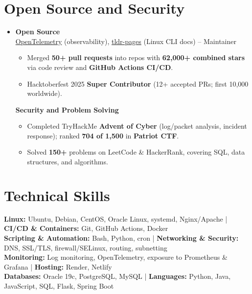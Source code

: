 \documentclass[a4paper]{article}
\newcommand{\subheading}[1]{\noindent \textbf{#1} \\}
\begin{document}
\section{Open Source and Security}
\begin{itemize}[leftmargin=0.15in, label={}, parsep=0pt]
\item
\small
\subheading{Open Source}
\href{https://github.com/open-telemetry}{OpenTelemetry} (observability), \href{https://github.com/tldr-pages/tldr}{tldr-pages} (Linux CLI docs) --
Maintainer
\begin{itemize}[noitemsep, topsep=0pt]
    \item Merged \textbf{50+ pull requests} into repos with \textbf{62,000+ combined stars} via code review and \textbf{GitHub Actions CI/CD}.
    \item Hacktoberfest 2025 \textbf{Super Contributor} (12+ accepted PRs; first 10,000 worldwide).
\end{itemize}

\vspace{0.5em}

\subheading{Security and Problem Solving}
\begin{itemize}[noitemsep, topsep=0pt, partopsep=0pt]
\item Completed TryHackMe \textbf{Advent of Cyber} (log/packet analysis, incident response); ranked \textbf{704 of 1,500} in \textbf{Patriot CTF}.
\item Solved \textbf{150+} problems on LeetCode \& HackerRank, covering SQL, data structures, and algorithms.
\end{itemize}
\end{itemize}


\section{Technical Skills}
\begin{itemize}[leftmargin=0.15in, label={}]
\small{\item{
\textbf{Linux:} Ubuntu, Debian, CentOS, Oracle Linux, systemd, Nginx/Apache \;|\; \textbf{CI/CD \& Containers:} Git, GitHub Actions, Docker\\
\textbf{Scripting \& Automation:} Bash, Python, cron \;|\; \textbf{Networking \& Security:} DNS, SSL/TLS, firewall/SELinux, routing, subnetting\\
\textbf{Monitoring:} Log monitoring, OpenTelemetry, exposure to Prometheus \& Grafana \;|\; \textbf{Hosting:} Render, Netlify\\
\textbf{Databases:} Oracle 19c, PostgreSQL, MySQL \;|\; \textbf{Languages:} Python, Java, JavaScript, SQL, Flask, Spring Boot
}}
\end{itemize}
\end{document}
